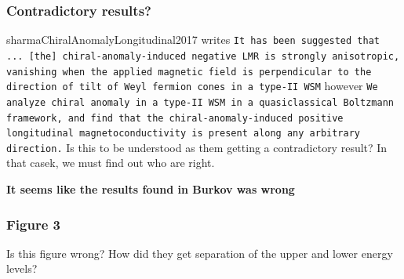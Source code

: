 \documentclass[11pt]{article}
\begin{document}
\subsubsection{Contradictory results?}
\label{sec:org159d6ba}
sharmaChiralAnomalyLongitudinal2017 writes
\texttt{It has been suggested that ... [the] chiral-anomaly-induced negative LMR is strongly anisotropic, vanishing when the applied magnetic field is perpendicular to the direction of tilt of Weyl fermion cones in a type-II WSM}
however
\texttt{We analyze chiral anomaly in a type-II WSM in a quasiclassical Boltzmann framework, and find that the chiral-anomaly-induced positive longitudinal magnetoconductivity is present along any arbitrary direction.}
Is this to be understood as them getting a contradictory result?
In that casek, we must find out who are right.

\textbf{It seems like the results found in Burkov was wrong}

\subsubsection{Figure 3}
\label{sec:orgef28dc9}
Is this figure wrong?
How did they get separation of the upper and lower energy levels?
\end{document}
